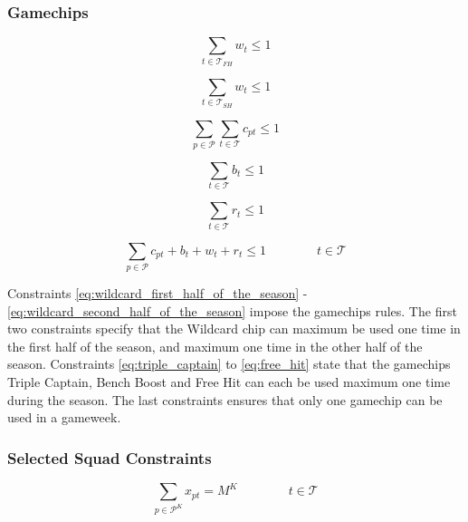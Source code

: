 \subsubsection{Gamechips} \label{gamechips}


\begin{equation} \label{eq:wildcard_first_half_of_the_season}
    \sum_{t \in \mathcal{T}_{FH}} w_{t} \leq 1
\end{equation}

\begin{equation} \label{eq:wildcard_second_half_of_the_season}
    \sum_{t \in \mathcal{T}_{SH}} w_{t} \leq 1
\end{equation}


\begin{equation} \label{eq:triple_captain} 
    \sum_{p \in \mathcal{P}} \sum_{t \in \mathcal{T}} c_{pt} \leq 1
\end{equation}

\begin{equation} \label{eq:bench_boost}
    \sum_{t \in \mathcal{T}} b_{t} \leq 1
\end{equation}

\begin{equation} \label{eq:free_hit}
    \sum_{t \in \mathcal{T}} r_{t} \leq 1
\end{equation}

\begin{equation} \label{eq:all_gamechips}
    \sum_{p \in \mathcal{P}} c_{pt} + b_{t} + w_{t} + r_{t} \leq 1 \qquad \qquad t \in \mathcal{T}
\end{equation}

Constraints \eqref{eq:wildcard_first_half_of_the_season} - \eqref{eq:wildcard_second_half_of_the_season} impose the gamechips rules. The first two constraints specify that the Wildcard chip can maximum be used one time in the first half of the season, and maximum one time in the other half of the season. Constraints \eqref{eq:triple_captain} to \eqref{eq:free_hit} state that the gamechips Triple Captain, Bench Boost and Free Hit can each be used maximum one time during the season. The last constraints ensures that only one gamechip can be used in a gameweek.  

\subsubsection{Selected Squad Constraints} \label{team_sel}
\begin{equation} \label{eq:sel_keeper}
    \sum_{p \in \mathcal{P}^{K}} x_{pt} = M^{K} \qquad\qquad t \in \mathcal{T}
\end{equation}

